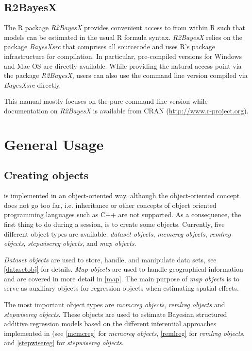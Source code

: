 \subsection{R2BayesX}

The R package {\it R2BayesX} provides convenient access to \BayesX from within R such that models can be estimated in the usual R formula syntax. {\it R2BayesX} relies on the package {\it BayesXsrc} that comprises all \BayesX sourcecode and uses R's package infrastructure for compilation. In particular, pre-compiled versions for Windows and Mac OS are directly available. While providing the natural access point via the package {\it R2BayesX}, users can also use the command line version compiled via {\it BayesXsrc} directly.

This manual mostly focuses on the pure command line version while documentation on {\it R2BayesX} is available from CRAN (\href{http://www.r-project.org}{http://www.r-project.org}). 

\section{General Usage}
\label{generalusage}

\subsection{Creating objects}
 \label{createobject} 

\BayesX is implemented in an object-oriented way, although the object-oriented concept does not go too far, i.e. inheritance or other concepts of object oriented programming languages such as C++ are not supported. As a consequence, the first thing to do during a session, is to create some objects. Currently, five different object types are available: {\em dataset objects}, {\em mcmcreg objects}, {\em remlreg objects}, {\em stepwisereg objects}, and {\em map objects}.

{\em Dataset objects} are used to store, handle, and manipulate data sets, see \autoref{datasetobj} for details. {\em Map objects} are used to handle geographical information and are covered in more detail in \autoref{map}. The main purpose of {\em map objects} is to serve as auxiliary objects for regression objects when estimating spatial effects. 

The most important object types are {\em mcmcreg objects}, {\em remlreg objects} and {\em stepwisereg objects}. These objects are used to estimate Bayesian structured additive regression models based on the different inferential approaches implemented in \BayesX (see \autoref{mcmcreg} for {\em mcmcreg objects}, \autoref{remlreg} for {\em remlreg objects}, and \autoref{stepwisereg} for {\em stepwisereg objects}.

